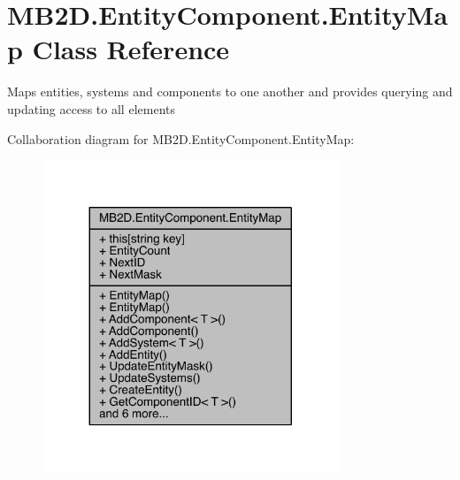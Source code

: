 \hypertarget{class_m_b2_d_1_1_entity_component_1_1_entity_map}{}\section{M\+B2\+D.\+Entity\+Component.\+Entity\+Map Class Reference}
\label{class_m_b2_d_1_1_entity_component_1_1_entity_map}


Maps entities, systems and components to one another and provides querying and updating access to all elements  




Collaboration diagram for M\+B2\+D.\+Entity\+Component.\+Entity\+Map\+:\nopagebreak
\begin{figure}[H]
\begin{center}
\leavevmode
\includegraphics[width=251pt]{class_m_b2_d_1_1_entity_component_1_1_entity_map__coll__graph}
\end{center}
\end{figure}
